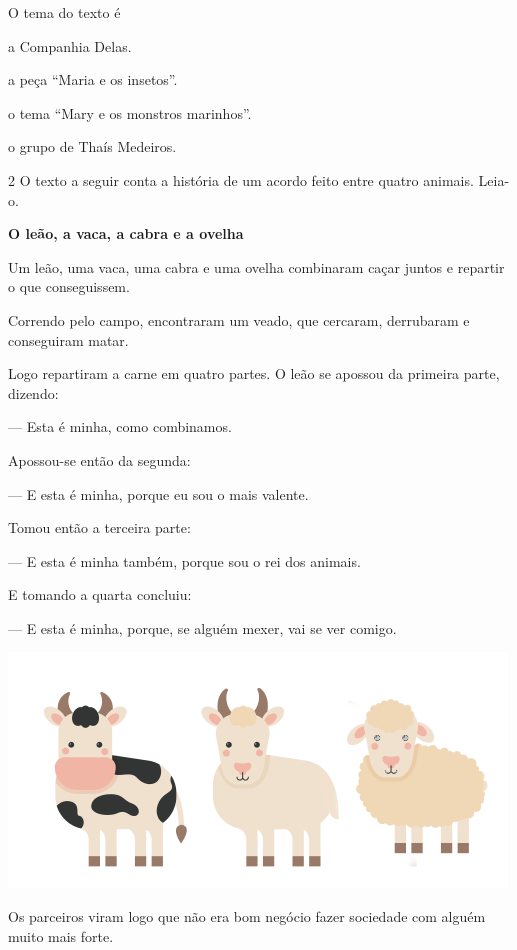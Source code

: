 \pagebreak
O tema do texto é

\begin{escolha}
\item a Companhia Delas.

\item a peça ``Maria e os insetos''.

\item o tema ``Mary e os monstros marinhos''.

\item o grupo de Thaís Medeiros.
\end{escolha}

\num{2} O texto a seguir conta a história de um acordo feito entre quatro
animais. Leia-o.

\begin{myquote}
\textbf{O leão, a vaca, a cabra e a ovelha}

Um leão, uma vaca, uma cabra e uma ovelha combinaram
caçar juntos e repartir o que conseguissem.

Correndo pelo campo, encontraram um veado, que
cercaram, derrubaram e conseguiram matar.

Logo repartiram a carne em quatro partes. O leão se
apossou da primeira parte, dizendo:

--- Esta é minha, como combinamos.

Apossou-se então da segunda:

--- E esta é minha, porque eu sou o mais valente.

Tomou então a terceira parte:

--- E esta é minha também, porque sou o rei dos
animais.

E tomando a quarta concluiu:

--- E esta é minha, porque, se alguém mexer, vai se ver
comigo.

\begin{center}
\includegraphics[width=.5\textwidth]{./media/image23d.png}
\end{center}

Os parceiros viram logo que não era bom negócio fazer
sociedade com alguém muito mais forte.

\end{myquote}

